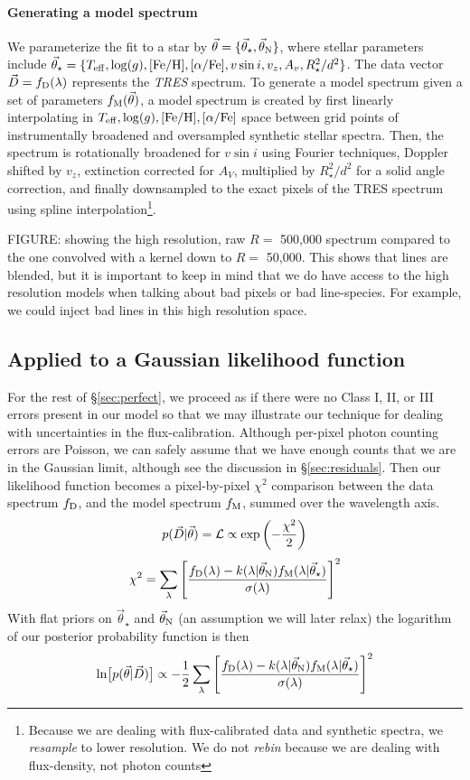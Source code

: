 \documentclass[preprint]{aastex} %
\newcommand{\vt}{\vec{\theta}}
\newcommand{\vstar}{\vt_{\star}}
\newcommand{\vN}{\vt_{\rm N}}
\newcommand{\fM}{f_{\rm M}}
\newcommand{\fD}{f_{\rm D}}
\newcommand{\vD}{\vec{D}}
\newcommand{\Z}{[{\rm Fe}/{\rm H}]}
\newcommand{\A}{[\alpha/{\rm Fe}]}
\begin{document}
\paragraph{Generating a model spectrum} We parameterize the fit to a star by $\vt = \{\vstar, \vN \}$, where stellar parameters include $\vstar = \{T_{\rm eff}, \log(g), \Z, \A, v \sin i, v_z, A_v, R_\star^2/d^2 \}$. The data vector $\vD = \fD(\lambda)$ represents the \emph{TRES} spectrum. To generate a model spectrum given a set of parameters $\fM(\vt)$, a model spectrum is created by first linearly interpolating in $T_{\rm eff}, \log(g), \Z, \A$ space between grid points of instrumentally broadened and oversampled synthetic stellar spectra. Then, the spectrum is rotationally broadened for $v \sin i$ using Fourier techniques, Doppler shifted by $v_z$, extinction corrected for $A_V$, multiplied by $R_\star^2/d^2$ for a solid angle correction, and finally downsampled to the exact pixels of the TRES spectrum using spline interpolation\footnote{Because we are dealing with flux-calibrated data and synthetic spectra, we \emph{resample} to lower resolution. We do not \emph{rebin} because we are dealing with flux-density, not photon counts}.

FIGURE: showing the high resolution, raw $R =$ 500,000 spectrum compared to the one convolved with a kernel down to $R =$ 50,000. This shows that lines are blended, but it is important to keep in mind that we do have access to the high resolution models when talking about bad pixels or bad line-species. For example, we could inject bad lines in this high resolution space.

\subsection{Applied to a Gaussian likelihood function}
For the rest of \S\ref{sec:perfect}, we proceed as if there were no Class I, II, or III errors present in our model so that we may illustrate our technique for dealing with uncertainties in the flux-calibration. Although per-pixel photon counting errors are Poisson, we can safely assume that we have enough counts that we are in the Gaussian limit, although see the discussion in \S\ref{sec:residuals}. Then our likelihood function becomes a pixel-by-pixel $\chi^2$ comparison between the data spectrum $\fD$, and the model spectrum $\fM$, summed over the wavelength axis. 
\begin{equation}
 p(\vD | \vt) = {\cal L} \propto \exp \left(-\frac{\chi^2}{2} \right)
\end{equation}
\begin{equation}
  \chi^2 = \sum_\lambda \left [\frac{ \fD(\lambda) - k(\lambda | \vN) \fM(\lambda | \vstar) }{\sigma(\lambda)} \right ]^2
\end{equation}
With flat priors on $\vstar$ and $\vN$ (an assumption we will later relax) the logarithm of our posterior probability function is then
\begin{equation}
  \ln \bigl [p(\vt | \vD) \bigr] \propto - \frac{1}{2} \sum_\lambda \left [\frac{ \fD(\lambda) - k(\lambda | \vN) \fM(\lambda | \vstar) }{\sigma(\lambda)} \right ]^2
  \label{eqn:lnprob}
\end{equation}
\end{document}
